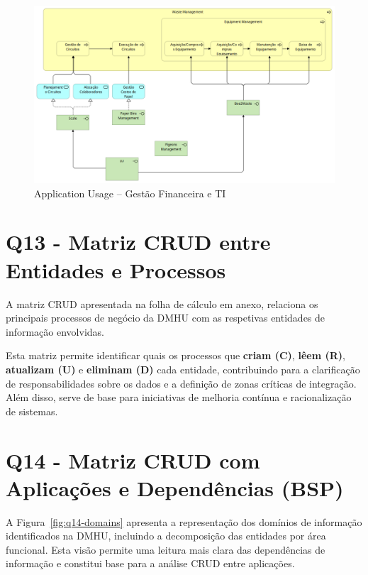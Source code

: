 \documentclass[12pt,a4paper,final]{article}
\begin{document}
    \begin{figure}[H]
        \centering
        \includegraphics[width=\textwidth]{Q10_8}
        \caption{Application Usage – Gestão Financeira e TI}
        \label{fig:q10_8}
    \end{figure}

    \section*{Q13 - Matriz CRUD entre Entidades e Processos}

    A matriz CRUD apresentada na folha de cálculo em anexo, relaciona os principais processos de negócio da DMHU com as respetivas entidades de informação envolvidas.

    Esta matriz permite identificar quais os processos que \textbf{criam (C)}, \textbf{lêem (R)}, \textbf{atualizam (U)} e \textbf{eliminam (D)} cada entidade, contribuindo para a clarificação de responsabilidades sobre os dados e a definição de zonas críticas de integração.
    Além disso, serve de base para iniciativas de melhoria contínua e racionalização de sistemas.

    \section*{Q14 - Matriz CRUD com Aplicações e Dependências (BSP)}

    A Figura~\ref{fig:q14-domains} apresenta a representação dos domínios de informação identificados na DMHU, incluindo a decomposição das entidades por área funcional.
    Esta visão permite uma leitura mais clara das dependências de informação e constitui base para a análise CRUD entre aplicações.
\end{document}
